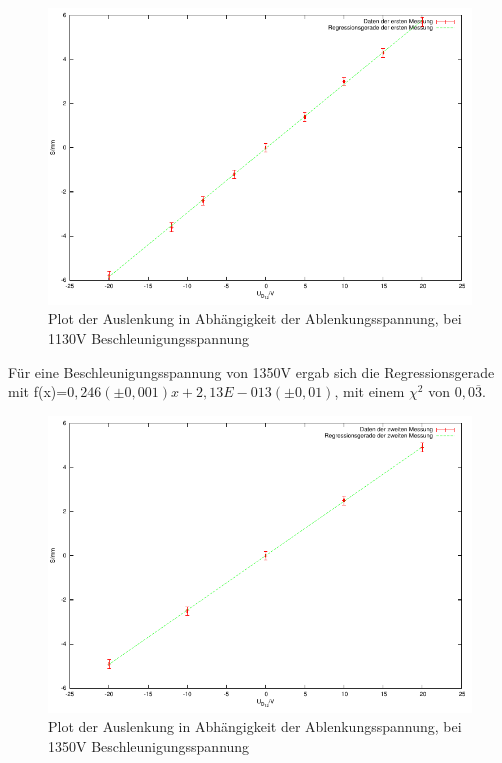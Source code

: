 \documentclass[12pt]{scrartcl}
\begin{document}
\begin{figure}[htbp] 
  \centering
    \includegraphics[scale = 1]{x_1.pdf}
  	\caption[Plot der Auslenkung in Abhängigkeit der Ablenkungsspannung, bei 1130V Beschleunigungsspannung]{Plot der Auslenkung in Abhängigkeit der Ablenkungsspannung, bei 1130V Beschleunigungsspannung}
  \label{fig:x_1}
\end{figure}



\newpage

Für eine Beschleunigungsspannung von 1350V ergab sich die Regressionsgerade mit f(x)=$0,246 (\pm 0,001) x  + 2,13E-013	 (\pm 0,01)$, mit einem $\chi^2$ von $0,0\overline{3}$. %


\begin{figure}[htbp] 
  \centering
    \includegraphics[scale = 1]{x_2.pdf}
  	\caption[Plot der Auslenkung in Abhängigkeit der Ablenkungsspannung, bei 1350V Beschleunigungsspannung]{Plot der Auslenkung in Abhängigkeit der Ablenkungsspannung, bei 1350V Beschleunigungsspannung}
  \label{fig:x_1}
\end{figure}
\end{document}
